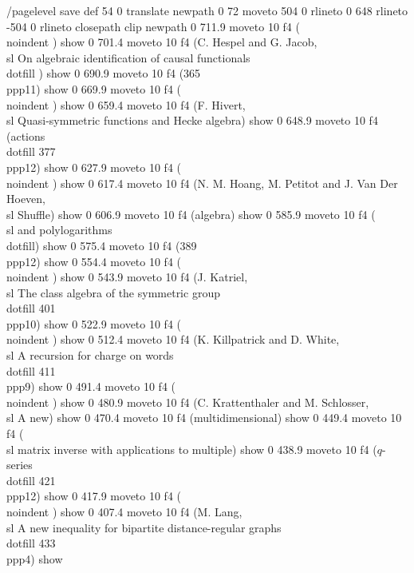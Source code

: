 /pagelevel save def
54 0 translate
newpath 0 72 moveto 504 0 rlineto 0 648 rlineto -504 0 rlineto  closepath clip newpath
0 711.9 moveto
10 f4
(\\noindent     ) show
0 701.4 moveto
10 f4
(C. Hespel and G. Jacob,  {\\sl On algebraic identification of causal functionals}\\dotfill ) show
0 690.9 moveto
10 f4
(365\\ppp{11}) show
0 669.9 moveto
10 f4
(\\noindent     ) show
0 659.4 moveto
10 f4
(F. Hivert,  {\\sl Quasi-symmetric functions and Hecke algebra) show
0 648.9 moveto
10 f4
(actions}\\dotfill   377\\ppp{12}) show
0 627.9 moveto
10 f4
(\\noindent     ) show
0 617.4 moveto
10 f4
(N. M. Hoang, M. Petitot and J. Van Der Hoeven,  {\\sl Shuffle) show
0 606.9 moveto
10 f4
(algebra}) show
0 585.9 moveto
10 f4
({\\sl  and polylogarithms}\\dotfill) show
0 575.4 moveto
10 f4
(389\\ppp{12}) show
0 554.4 moveto
10 f4
(\\noindent     ) show
0 543.9 moveto
10 f4
(J. Katriel,  {\\sl The class algebra of the symmetric group}\\dotfill   401\\ppp{10}) show
0 522.9 moveto
10 f4
(\\noindent     ) show
0 512.4 moveto
10 f4
(K. Killpatrick and D. White,  {\\sl A recursion for charge on words}\\dotfill   411\\ppp{9}) show
0 491.4 moveto
10 f4
(\\noindent     ) show
0 480.9 moveto
10 f4
(C. Krattenthaler and M. Schlosser,  {\\sl A new) show
0 470.4 moveto
10 f4
(multidimensional}) show
0 449.4 moveto
10 f4
({\\sl  matrix inverse with applications to multiple) show
0 438.9 moveto
10 f4
($q$-series}\\dotfill   421\\ppp{12}) show
0 417.9 moveto
10 f4
(\\noindent     ) show
0 407.4 moveto
10 f4
(M. Lang,  {\\sl A new inequality for bipartite distance-regular graphs}\\dotfill   433\\ppp{4}) show
